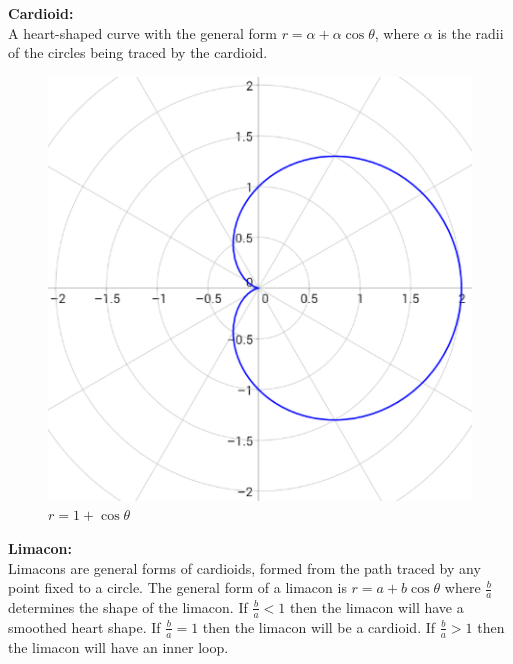         \pagebreak
        \noindent \textbf{Cardioid:} \\
        A heart-shaped curve with the general form $r=\alpha+\alpha\cos\theta$, where $\alpha$ is
        the radii of the circles being traced by the cardioid. \\

        \begin{figure} [hbt!]
            \centering
            \includegraphics[scale=0.4]{Resources/Unit3Vectors/cardioid.PNG}
            \caption*{$r=1+\cos\theta$}
        \end{figure}

        \noindent \textbf{Limacon:} \\
        Limacons are general forms of cardioids, formed from the path traced by any point fixed
        to a circle. The general form of a limacon is $r=a+b\cos\theta$ where $\frac{b}{a}$
        determines the shape of the limacon. If $\frac{b}{a}<1$ then the limacon will have a
        smoothed heart shape. If $\frac{b}{a}=1$ then the limacon will be a cardioid.
        If $\frac{b}{a}>1$ then the limacon will have an inner loop.

